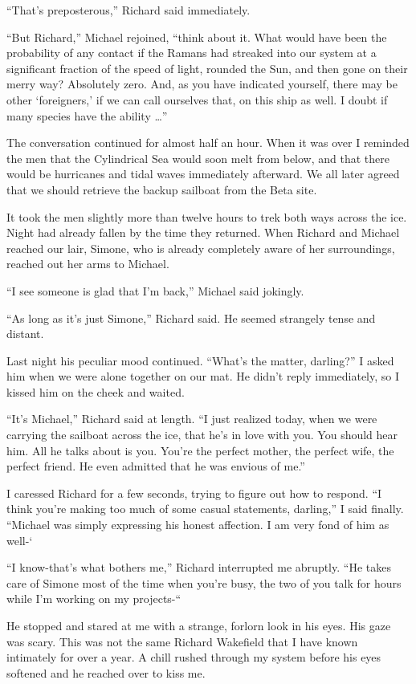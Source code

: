 \documentclass[]{article}
\begin{document}
“That’s preposterous,” Richard said immediately.

“But Richard,” Michael rejoined, “think about it.  What would have been the probability of any contact if the Ramans had streaked into our system at a significant fraction of the speed of light, rounded the Sun, and then gone on their merry way? Absolutely zero.  And, as you have indicated yourself, there may be other ‘foreigners,’ if we can call ourselves that, on this ship as well.  I doubt if many species have the ability …”

The conversation continued for almost half an hour.  When it was over I reminded the men that the Cylindrical Sea would soon melt from below, and that there would be hurricanes and tidal waves immediately afterward.  We all later agreed that we should retrieve the backup sailboat from the Beta site.

It took the men slightly more than twelve hours to trek both ways across the ice.  Night had already fallen by the time they returned.  When Richard and Michael reached our lair, Simone, who is already completely aware of her surroundings, reached out her arms to Michael.

“I see someone is glad that I’m back,” Michael said jokingly.

“As long as it’s just Simone,” Richard said.  He seemed strangely tense and distant.

Last night his peculiar mood continued.  “What’s the matter, darling?” I asked him when we were alone together on our mat.  He didn’t reply immediately, so I kissed him on the cheek and waited.

“It’s Michael,” Richard said at length.  “I just realized today, when we were carrying the sailboat across the ice, that he’s in love with you.  You should hear him.  All he talks about is you.  You’re the perfect mother, the perfect wife, the perfect friend.  He even admitted that he was envious of me.”

I caressed Richard for a few seconds, trying to figure out how to respond.  “I think you’re making too much of some casual statements, darling,” I said finally.  “Michael was simply expressing his honest affection.  I am very fond of him as well-‘

“I know-that’s what bothers me,” Richard interrupted me abruptly.  “He takes care of Simone most of the time when you’re busy, the two of you talk for hours while I’m working on my projects-“

He stopped and stared at me with a strange, forlorn look in his eyes.  His gaze was scary.  This was not the same Richard Wakefield that I have known intimately for over a year.  A chill rushed through my system before his eyes softened and he reached over to kiss me.
\end{document}
